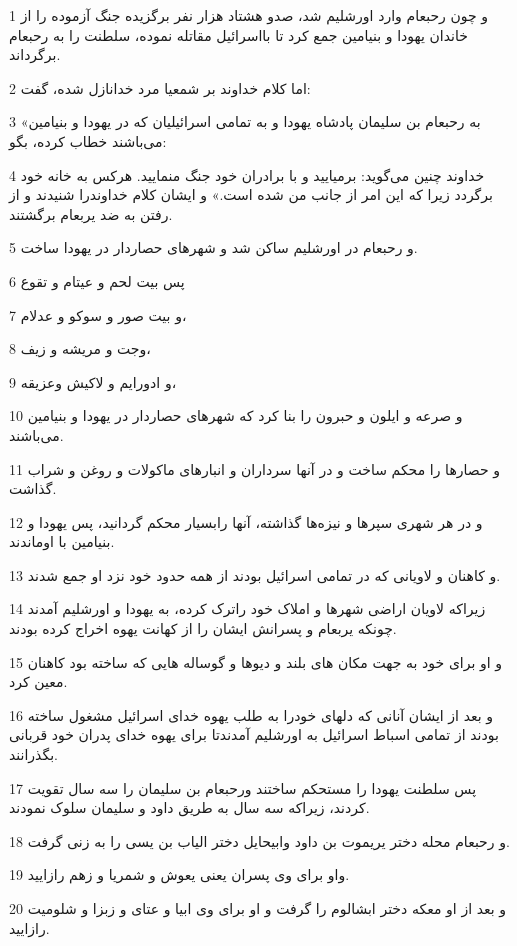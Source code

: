 \par 1 و چون رحبعام وارد اورشلیم شد، صدو هشتاد هزار نفر برگزیده جنگ آزموده را از خاندان یهودا و بنیامین جمع کرد تا بااسرائیل مقاتله نموده، سلطنت را به رحبعام برگرداند.
\par 2 اما کلام خداوند بر شمعیا مرد خدانازل شده، گفت:
\par 3 «به رحبعام بن سلیمان پادشاه یهودا و به تمامی اسرائیلیان که در یهودا و بنیامین می‌باشند خطاب کرده، بگو:
\par 4 خداوند چنین می‌گوید: برمیایید و با برادران خود جنگ منمایید. هرکس به خانه خود برگردد زیرا که این امر از جانب من شده است.» و ایشان کلام خداوندرا شنیدند و از رفتن به ضد یربعام برگشتند.
\par 5 و رحبعام در اورشلیم ساکن شد و شهرهای حصاردار در یهودا ساخت.
\par 6 پس بیت لحم و عیتام و تقوع
\par 7 و بیت صور و سوکو و عدلام،
\par 8 وجت و مریشه و زیف،
\par 9 و ادورایم و لاکیش وعزیقه،
\par 10 و صرعه و ایلون و حبرون را بنا کرد که شهرهای حصاردار در یهودا و بنیامین می‌باشند.
\par 11 و حصارها را محکم ساخت و در آنها سرداران و انبارهای ماکولات و روغن و شراب گذاشت.
\par 12 و در هر شهری سپرها و نیزه‌ها گذاشته، آنها رابسیار محکم گردانید، پس یهودا و بنیامین با اوماندند.
\par 13 و کاهنان و لاویانی که در تمامی اسرائیل بودند از همه حدود خود نزد او جمع شدند.
\par 14 زیراکه لاویان اراضی شهرها و املاک خود راترک کرده، به یهودا و اورشلیم آمدند چونکه یربعام و پسرانش ایشان را از کهانت یهوه اخراج کرده بودند.
\par 15 و او برای خود به جهت مکان های بلند و دیوها و گوساله هایی که ساخته بود کاهنان معین کرد.
\par 16 و بعد از ایشان آنانی که دلهای خودرا به طلب یهوه خدای اسرائیل مشغول ساخته بودند از تمامی اسباط اسرائیل به اورشلیم آمدندتا برای یهوه خدای پدران خود قربانی بگذرانند.
\par 17 پس سلطنت یهودا را مستحکم ساختند ورحبعام بن سلیمان را سه سال تقویت کردند، زیراکه سه سال به طریق داود و سلیمان سلوک نمودند.
\par 18 و رحبعام محله دختر یریموت بن داود وابیحایل دختر الیاب بن یسی را به زنی گرفت.
\par 19 واو برای وی پسران یعنی یعوش و شمریا و زهم رازایید.
\par 20 و بعد از او معکه دختر ابشالوم را گرفت و او برای وی ابیا و عتای و زبزا و شلومیت رازایید.
